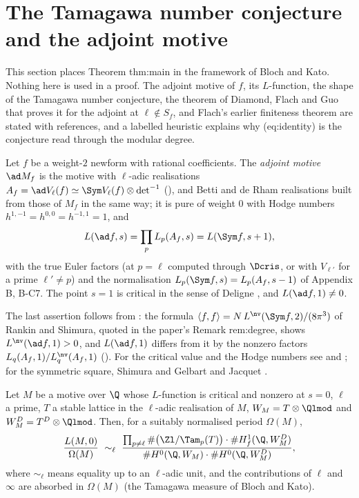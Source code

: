 \section[The Tamagawa number conjecture]{The Tamagawa number conjecture and the adjoint motive}\label{sec:blochkato:motive}

This section places Theorem thm:main in the framework of Bloch and Kato. Nothing here is used in a proof. The adjoint motive of $f$, its $L$-function, the shape of the
Tamagawa number conjecture, the theorem of Diamond, Flach and Guo that proves it for the adjoint at $\ell\notin S_f$, and Flach's earlier finiteness theorem are stated with
references, and a labelled heuristic explains why (eq:identity) is the conjecture read through the modular degree.

\begin{definition}\label{def:blochkato:adjoint-motive}
Let $f$ be a weight-$2$ newform with rational coefficients. The \emph{adjoint motive} $\ad M_f$ is the motive with $\ell$-adic realisations $A_f=\ad V_\ell(f)\simeq\Sym V_\ell(f)\otimes\det^{-1}$
(), and Betti and de Rham realisations built from those of $M_f$ in the same way; it is pure of weight $0$ with Hodge numbers $h^{1,-1}=h^{0,0}=h^{-1,1}=1$, and
\[
L(\ad f,s)=\prod_pL_p(A_f,s)=L(\Sym f,s+1),
\]
with the true Euler factors (at $p=\ell$ computed through $\Dcris$, or with $V_{\ell'}$ for a prime $\ell'\ne p$) and the normalisation $L_p(\Sym f,s)=L_p(A_f,s-1)$ of
Appendix B, B-C7. The point $s=1$ is critical in the sense of Deligne \cite{Deligne79}, and $L(\ad f,1)\ne0$.
\end{definition}

The last assertion follows from : the formula $\langle f,f\rangle=N\,L^{\nv}(\Sym f,2)/(8\pi^3)$ of Rankin and Shimura, quoted in the paper's Remark rem:degree, shows
$L^{\nv}(\ad f,1)>0$, and $L(\ad f,1)$ differs from it by the nonzero factors $L_q(A_f,1)/L^{\nv}_q(A_f,1)$ (). For the critical value and the
Hodge numbers see \cite{Deligne79} and \cite[Section 1]{DFG04}; for the symmetric square, Shimura \cite{Shimura76} and Gelbart and Jacquet \cite{GelbartJacquet}.

\begin{conjecture}\label{conj:blochkato:tnc}
Let $M$ be a motive over $\Q$ whose $L$-function is critical and nonzero at $s=0$, $\ell$ a prime, $T$ a stable lattice in the $\ell$-adic realisation of $M$, $W_M=T\otimes\Qlmod$ and
$W_M^D=T^D\otimes\Qlmod$. Then, for a suitably normalised period $\Omega(M)$,
\[
\frac{L(M,0)}{\Omega(M)}\ \sim_\ell\ \frac{\prod_{p\ne\ell}\#\bigl(\Zl/\Tam_p(T)\bigr)\cdot\#H^1_f(\Q,W_M^D)}{\#H^0(\Q,W_M)\cdot\#H^0(\Q,W_M^D)},
\]
where $\sim_\ell$ means equality up to an $\ell$-adic unit, and the contributions of $\ell$ and $\infty$ are absorbed in $\Omega(M)$ (the Tamagawa measure of Bloch and Kato).
\end{conjecture}

